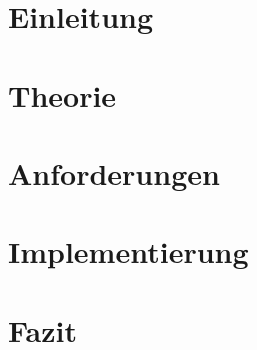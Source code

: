 \section{Einleitung}\label{sec:intro}


\newpage
\section{Theorie}\label{sec:theory}


\newpage
\section{Anforderungen}\label{sec:requirements}


\newpage
\section{Implementierung}\label{sec:implementation}


\newpage
\section{Fazit}\label{sec:conclusion}

